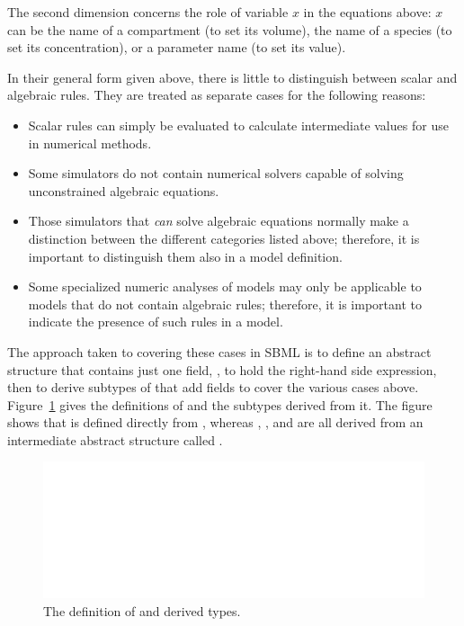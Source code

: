 \documentclass[10pt]{cekarticle}
\newcommand{\vref}[1]{\ref{#1}}
\newcommand{\changed}[1]{\textcolor{BrickRed}{#1}}
\newenvironment{blockChanged}{\color{BrickRed}}{}
\begin{document}
The second dimension concerns the role of variable $x$ in the equations
above: $x$ can be the name of a compartment (to set its volume), the name
of a \changed{species} (to set its concentration), or a parameter name (to
set its value).  

\begin{blockChanged}
In their general form given above, there is little to distinguish between
scalar and algebraic rules.  They are treated as separate cases for the
following reasons:
\begin{itemize}
  
\item Scalar rules can simply be evaluated to calculate intermediate
  values for use in numerical methods.
  
\item Some simulators do not contain numerical solvers capable of solving
  unconstrained algebraic equations.
  
\item Those simulators that \emph{can} solve algebraic equations normally
  make a distinction between the different categories listed above;
  therefore, it is important to distinguish them also in a model
  definition.
  
\item Some specialized numeric analyses of models may only be applicable to
  models that do not contain algebraic rules; therefore, it is important to
  indicate the presence of such rules in a model.
\end{itemize}
\end{blockChanged}

The approach taken to covering these cases in SBML is to define an abstract
 structure that contains just one field, , to
hold the right-hand side expression, then to derive subtypes of
 that add fields to cover the various cases above.
Figure~\vref{fig:rules} gives the definitions of  and the
subtypes derived from it.  The figure shows that  is
defined directly from , whereas ,
, and  are all derived
from an intermediate abstract structure called .

\begin{figure}[htb]
  \centering
  \vspace*{-3pt}
  \includegraphics[scale = 0.65]{rule}
  \vspace*{-3pt}
  \caption{The definition of  and derived types.}
  \label{fig:rules}
\end{figure}
\end{document}
